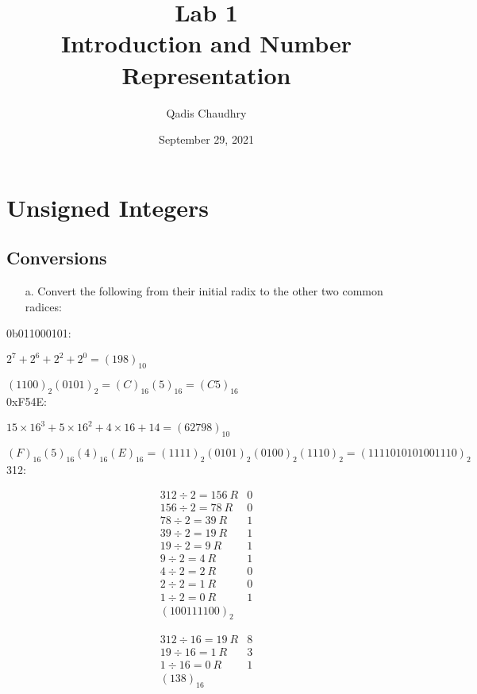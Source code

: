 \documentclass[12pt]{article}
\title{Lab 1 \\ Introduction and Number Representation}
\author{Qadis Chaudhry}
\date{September 29, 2021}
\begin{document}
\maketitle
    \section{Unsigned Integers}
    \subsection*{Conversions}
    \begin{itemize}
        \item[a.] Convert the following from their initial radix to the other
            two common radices:
    \end{itemize}
    0b011000101:
    \par $2^{7} + 2^{6} + 2^{2} + 2^{0} = \boxed{(198)_{10}}$
    \par $(1100)_{2}(0101)_{2} = (C)_{16}(5)_{16} = \boxed{(C5)_{16}}$ \\
    0xF54E:
    \par $15 \times 16^{3} + 5 \times 16^{2} + 4 \times 16 + 14 = \boxed{(62798)_{10}}$
    \par $(F)_{16}(5)_{16}(4)_{16}(E)_{16} =
    (1111)_{2}(0101)_{2}(0100)_{2}(1110)_{2} = \boxed{(1111010101001110)_{2}}$ \\
    312:
    \\
    \begin{minipage}{0.5\linewidth}
        \begin{align*}
            312 \div 2 = 156\ R&0 \\
            156 \div 2 = 78\ R&0 \\
            78 \div 2 = 39\ R&1 \\
            39 \div 2 = 19\ R&1 \\
            19 \div 2 = 9\ R&1 \\
            9 \div 2 = 4\ R&1 \\
            4 \div 2 = 2\ R&0 \\
            2 \div 2 = 1\ R&0 \\
            1 \div 2 = 0\ R&1 \\
            \boxed{(100111100)_{2}}
        \end{align*}
    \end{minipage}
    \begin{minipage}{0.5\linewidth}
        \begin{align*}
            312 \div 16 = 19\ R&8 \\
            19 \div 16 = 1\ R&3 \\
            1 \div 16 = 0\ R&1 \\
            \boxed{(138)_{16}}
        \end{align*}
    \end{minipage}
\end{document}
